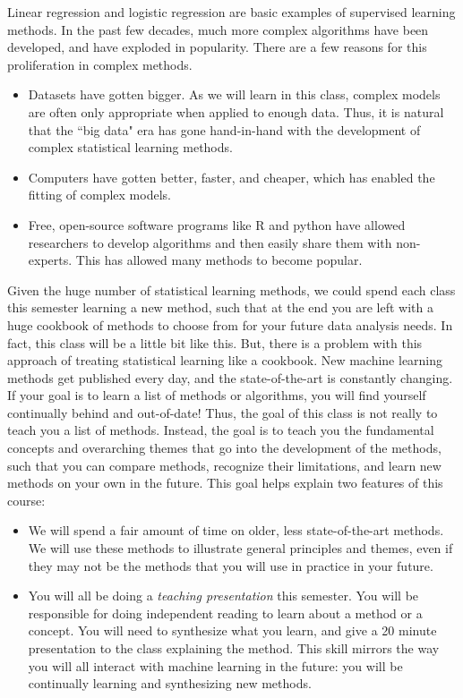 \documentclass[titlepage,10pt]{scrartcl}
\begin{document}
Linear regression and logistic regression are basic examples of supervised learning methods. In the past few decades, much more complex algorithms have been developed, and have exploded in popularity. There are a few reasons for this proliferation in complex methods. 
\begin{itemize}
\item Datasets have gotten bigger. As we will learn in this class, complex models are often only appropriate when applied to enough data. Thus, it is natural that the ``big data" era has gone hand-in-hand with the development of complex statistical learning methods. 
\item Computers have gotten better, faster, and cheaper, which has enabled the fitting of complex models. 
\item Free, open-source software programs like R and python have allowed researchers to develop algorithms and then easily share them with non-experts. This has allowed many methods to become popular. 
\end{itemize}
Given the huge number of statistical learning methods, we could spend each class this semester learning a new method, such that at the end you are left with a huge cookbook of methods to choose from for your future data analysis needs. In fact, this class will be a little bit like this. But, there is a problem with this approach of treating statistical learning like a cookbook. New machine learning methods get published every day, and the state-of-the-art is constantly changing. If your goal is to learn a list of methods or algorithms, you will find yourself continually behind and out-of-date! Thus, the goal of this class is not really to teach you a list of methods. Instead, the goal is to teach you the fundamental concepts and overarching themes that go into the development of the methods, such that you can compare methods, recognize their limitations, and learn new methods on your own in the future. This goal helps explain two features of this course: 
\begin{itemize}
	\item We will spend a fair amount of time on older, less state-of-the-art methods. We will use these methods to illustrate general principles and themes, even if they may not be the methods that you will use in practice in your future. 
	\item You will all be doing a \emph{teaching presentation} this semester. You will be responsible for doing independent reading to learn about a method or a concept. You will need to synthesize what you learn, and give a 20 minute presentation to the class explaining the method. This skill mirrors the way you will all interact with machine learning in the future: you will be continually learning and synthesizing new methods. 
\end{itemize}
\end{document}
